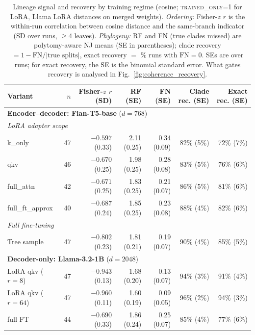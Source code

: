 \documentclass{article}
\theoremstyle{definition}
\theoremstyle{plain}
\begin{document}
\begin{table}[t]
\caption{Lineage signal and recovery by training regime (cosine; \textsc{trained\_only=1} for LoRA,
  Llama LoRA distances on merged weights). \emph{Ordering:} Fisher-$z$ $r$ is the within-run correlation
  between cosine distance and the same-branch indicator (SD over runs, $\geq 4$ leaves).
  \emph{Phylogeny:} RF and FN (true clades missed) are polytomy-aware NJ means (SE in parentheses);
  clade recovery $=1-\mathrm{FN}/|\text{true splits}|$, exact recovery $=$ \% runs with $\mathrm{FN}=0$.
  SEs are over runs; for exact recovery, the SE is the binomial standard error.
  What gates recovery is analysed in Fig.~\ref{fig:coherence_recovery}.}
\label{tab:variants}
\begin{center}
\small
\setlength{\tabcolsep}{4pt}
\begin{tabular}{lrrrrrr}
\toprule
Variant & $n$ & Fisher-$z$ $r$ (SD) & RF (SE) & FN (SE) & Clade rec. (SE) & Exact rec. (SE) \\
\midrule
\multicolumn{7}{l}{\textbf{Encoder--decoder: Flan-T5-base} ($d=768$)} \\
\multicolumn{7}{l}{\quad\textit{LoRA adapter scope}} \\
\quad k\_only          & 47 & $-0.597$ (0.33) & 2.11 (0.25) & 0.34 (0.09) & 82\% (5\%) & 72\% (7\%) \\
\quad qkv              & 46 & $-0.670$ (0.25) & 1.98 (0.25) & 0.28 (0.08) & 83\% (5\%) & 76\% (6\%) \\
\quad full\_attn       & 42 & $-0.671$ (0.25) & 1.83 (0.25) & 0.21 (0.07) & 86\% (5\%) & 81\% (6\%) \\
\quad full\_ft\_approx & 40 & $-0.687$ (0.24) & 1.85 (0.25) & 0.23 (0.08) & 88\% (4\%) & 82\% (6\%) \\
\multicolumn{7}{l}{\quad\textit{Full fine-tuning}} \\
\quad Tree sample      & 47 & $-0.802$ (0.23) & 1.81 (0.21) & 0.19 (0.07) & 90\% (4\%) & 85\% (5\%) \\
\midrule
\multicolumn{7}{l}{\textbf{Decoder-only: Llama-3.2-1B} ($d=2048$)} \\
\quad LoRA qkv ($r{=}8$)  & 47 & $-0.943$ (0.13) & 1.68 (0.20) & 0.13 (0.07) & 94\% (3\%) & 91\% (4\%) \\
\quad LoRA qkv ($r{=}64$) & 47 & $-0.960$ (0.11) & 1.60 (0.19) & 0.09 (0.05) & 96\% (2\%) & 94\% (3\%) \\
\quad full FT             & 44 & $-0.690$ (0.33) & 1.86 (0.24) & 0.25 (0.07) & 85\% (4\%) & 77\% (6\%) \\
\bottomrule
\end{tabular}
\end{center}
\end{table}
\end{document}
